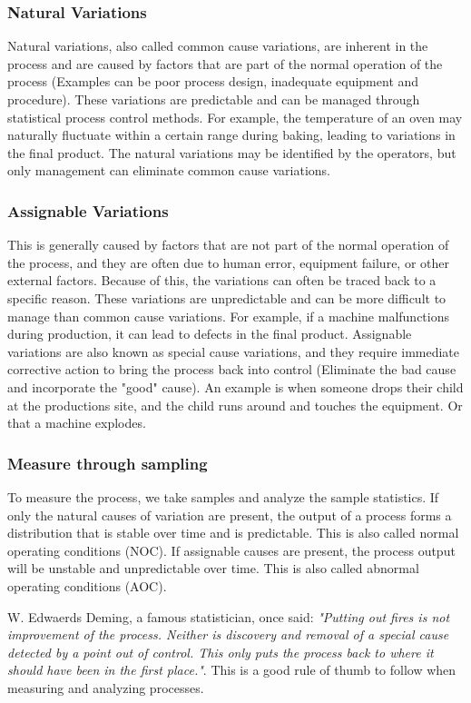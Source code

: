 \subsubsection{Natural Variations}
Natural variations, also called common cause variations, are inherent in the process and are caused by factors that are part of the normal operation of the process (Examples can be poor process design, inadequate equipment and procedure). These variations are predictable and can be managed through statistical process control methods. For example, the temperature of an oven may naturally fluctuate within a certain range during baking, leading to variations in the final product. The natural variations may be identified by the operators, but only management can eliminate common cause variations.

\subsubsection{Assignable Variations}
This is generally caused by factors that are not part of the normal operation of the process, and they are often due to human error, equipment failure, or other external factors. Because of this, the variations can often be traced back to a specific reason. These variations are unpredictable and can be more difficult to manage than common cause variations. For example, if a machine malfunctions during production, it can lead to defects in the final product. Assignable variations are also known as special cause variations, and they require immediate corrective action to bring the process back into control (Eliminate the bad cause and incorporate the "good" cause).
An example is when someone drops their child at the productions site, and the child runs around and touches the equipment. Or that a machine explodes.

\subsubsection{Measure through sampling}
To measure the process, we take samples and analyze the sample statistics. If only the natural causes of variation are present, the output of a process forms a distribution that is stable over time and is predictable. This is also called normal operating conditions (NOC). If assignable causes are present, the process output will be unstable and unpredictable over time. This is also called abnormal operating conditions (AOC).

W. Edwaerds Deming, a famous statistician, once said: \textit{"Putting out fires is not improvement of the process. Neither is discovery and removal of a special cause detected by a point out of control. This only puts the process back to where it should have been in the first place."}. This is a good rule of thumb to follow when measuring and analyzing processes.

